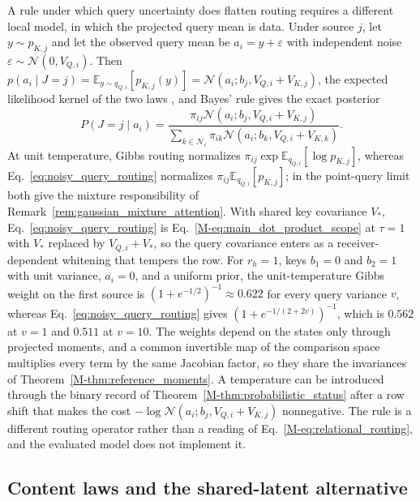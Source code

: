 \documentclass[twoside,11pt]{article}
\begin{document}
\begin{remark}
\label{rem:noisy_query}
A rule under which query uncertainty does flatten routing requires a different local model, in which the projected query mean is data. Under source $j$, let $y\sim p_{K,j}$ and let the observed query mean be $a_i=y+\varepsilon$ with independent noise $\varepsilon\sim\mathcal N(0,V_{Q,i})$. Then $p(a_i\mid J=j)=\mathbb E_{y\sim q_{Q,i}}[p_{K,j}(y)]=\mathcal N(a_i;b_j,V_{Q,i}+V_{K,j})$, the expected likelihood kernel of the two laws \citep[Secs.~2.1 and~3.1]{Jebara2004ProbabilityProduct}, and Bayes' rule gives the exact posterior
\begin{equation}
P(J=j\mid a_i)=\frac{\pi_{ij}\mathcal N(a_i;b_j,V_{Q,i}+V_{K,j})}{\sum_{k\in\mathcal N_i}\pi_{ik}\mathcal N(a_i;b_k,V_{Q,i}+V_{K,k})}.
\label{eq:noisy_query_routing}
\end{equation}
At unit temperature, Gibbs routing normalizes $\pi_{ij}\exp\mathbb E_{q_{Q,i}}[\log p_{K,j}]$, whereas Eq.~\eqref{eq:noisy_query_routing} normalizes $\pi_{ij}\mathbb E_{q_{Q,i}}[p_{K,j}]$; in the point-query limit both give the mixture responsibility of Remark~\ref{rem:gaussian_mixture_attention}. With shared key covariance $V_*$, Eq.~\eqref{eq:noisy_query_routing} is Eq.~\eqref{M-eq:main_dot_product_scope} at $\tau=1$ with $V_*$ replaced by $V_{Q,i}+V_*$, so the query covariance enters as a receiver-dependent whitening that tempers the row. For $r_h=1$, keys $b_1=0$ and $b_2=1$ with unit variance, $a_i=0$, and a uniform prior, the unit-temperature Gibbs weight on the first source is $(1+e^{-1/2})^{-1}\approx0.622$ for every query variance $v$, whereas Eq.~\eqref{eq:noisy_query_routing} gives $(1+e^{-1/(2+2v)})^{-1}$, which is $0.562$ at $v=1$ and $0.511$ at $v=10$. The weights depend on the states only through projected moments, and a common invertible map of the comparison space multiplies every term by the same Jacobian factor, so they share the invariances of Theorem~\ref{M-thm:reference_moments}. A temperature can be introduced through the binary record of Theorem~\ref{M-thm:probabilistic_status} after a row shift that makes the cost $-\log\mathcal N(a_i;b_j,V_{Q,i}+V_{K,j})$ nonnegative. The rule is a different routing operator rather than a reading of Eq.~\eqref{M-eq:relational_routing}, and the evaluated model does not implement it.
\end{remark}

\subsection{Content laws and the shared-latent alternative}
\label{sec:content_laws}
\end{document}
